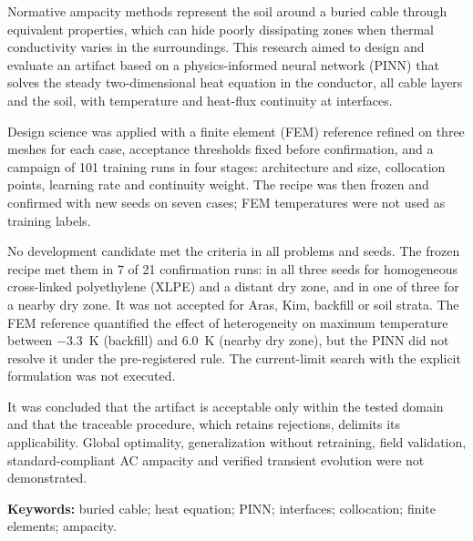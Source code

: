 Normative ampacity methods represent the soil around a buried cable through equivalent properties, which can hide poorly dissipating zones when thermal conductivity varies in the surroundings. This research aimed to design and evaluate an artifact based on a physics-informed neural network (PINN) that solves the steady two-dimensional heat equation in the conductor, all cable layers and the soil, with temperature and heat-flux continuity at interfaces.

Design science was applied with a finite element (FEM) reference refined on three meshes for each case, acceptance thresholds fixed before confirmation, and a campaign of 101 training runs in four stages: architecture and size, collocation points, learning rate and continuity weight. The recipe was then frozen and confirmed with new seeds on seven cases; FEM temperatures were not used as training labels.

No development candidate met the criteria in all problems and seeds. The frozen recipe met them in 7 of 21 confirmation runs: in all three seeds for homogeneous cross-linked polyethylene (XLPE) and a distant dry zone, and in one of three for a nearby dry zone. It was not accepted for Aras, Kim, backfill or soil strata. The FEM reference quantified the effect of heterogeneity on maximum temperature between \SI{-3.3}{\kelvin} (backfill) and \SI{+6.0}{\kelvin} (nearby dry zone), but the PINN did not resolve it under the pre-registered rule. The current-limit search with the explicit formulation was not executed.

It was concluded that the artifact is acceptable only within the tested domain and that the traceable procedure, which retains rejections, delimits its applicability. Global optimality, generalization without retraining, field validation, standard-compliant AC ampacity and verified transient evolution were not demonstrated.

\noindent\textbf{Keywords:} buried cable; heat equation; PINN; interfaces; collocation; finite elements; ampacity.
